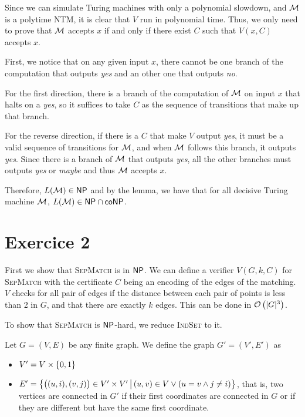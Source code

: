     Since we can simulate Turing machines with only a polynomial slowdown,
    and $\mathcal{M}$ is a polytime NTM, 
    it is clear that $V$ run in polynomial time.
    Thus, we only need to prove that $\mathcal{M}$ accepts $x$ if and only if there exist $C$
    such that $V(x, C)$ accepts $x$. 

    First, we notice that on any given input $x$, there cannot be one branch 
    of the computation that outputs \textit{yes} and an other one that outputs \textit{no}.
    
    For the first direction, there is a branch of the computation of 
    $\mathcal{M}$ on input $x$ that halts on a \textit{yes},
    so it suffices to take $C$ as the sequence of transitions
    that make up that branch.

    For the reverse direction, if there is a $C$ that make $V$ output \textit{yes},
    it must be a valid sequence of transitions for $\mathcal{M}$, 
    and when $\mathcal{M}$ follows this branch, it outputs \textit{yes}.
    Since there is a branch of $\mathcal{M}$ that outputs \textit{yes},
    all the other branches must outputs \textit{yes} or \textit{maybe}
    and thus $\mathcal{M}$ accepts $x$.

    Therefore, $L(\mathcal{M}) \in \mathsf{NP}$ and by the lemma, we have that for all 
    decisive Turing machine $\mathcal{M}$, $L(\mathcal{M}) \in \mathsf{NP} \cap \mathsf{coNP}$.


    \section*{Exercice 2}

    First we show that \textsc{SepMatch} is in $\mathsf{NP}$.
    We can define a verifier $V(G, k, C)$ 
    for \textsc{SepMatch} with the certificate $C$ being
    an encoding of the edges of the matching.
    $V$ checks for all pair of edges if the distance
    between each pair of points is less than 2 in $G$, 
    and that there are exactly $k$ edges. This can be done
    in $\mathcal{O}\left(|G|^3\right)$.

    To show that \textsc{SepMatch} is $\mathsf{NP}$-hard,
    we reduce \textsc{IndSet} to it.

    Let $G = (V, E)$ be any finite graph. We define the graph $G' = (V', E')$
    as \begin{itemize}
        \item $V' = V \times \left\{ 0, 1 \right\}$
        \item $E' = \left\{ 
            \big((u, i), (v, j)\big) \in V' \times V'
         \, \middle| \, 
            (u, v) \in V \vee (u = v \wedge j \neq i)
         \right\}$, that is, two vertices are connected in $G'$
        if their first coordinates are connected in $G$
        or if they are different but have the same first coordinate.
    \end{itemize}

